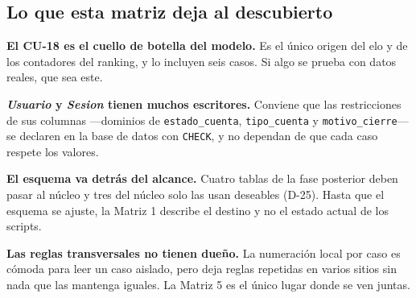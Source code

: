 \subsection*{Lo que esta matriz deja al descubierto}
\begin{flujo}
  \item \textbf{El \mbox{CU-18} es el cuello de botella del modelo.} Es el único origen del elo y de los contadores del ranking, y lo incluyen seis casos. Si algo se prueba con datos reales, que sea este.
  \item \textbf{\textit{Usuario} y \textit{Sesion} tienen muchos escritores.} Conviene que las restricciones de sus columnas —dominios de \texttt{estado\_\allowbreak{}cuenta}, \texttt{tipo\_\allowbreak{}cuenta} y \texttt{motivo\_\allowbreak{}cierre}— se declaren en la base de datos con \texttt{CHECK}, y no dependan de que cada caso respete los valores.
  \item \textbf{El esquema va detrás del alcance.} Cuatro tablas de la fase posterior deben pasar al núcleo y tres del núcleo solo las usan deseables (\mbox{D-25}). Hasta que el esquema se ajuste, la Matriz 1 describe el destino y no el estado actual de los scripts.
  \item \textbf{Las reglas transversales no tienen dueño.} La numeración local por caso es cómoda para leer un caso aislado, pero deja reglas repetidas en varios sitios sin nada que las mantenga iguales. La Matriz 5 es el único lugar donde se ven juntas.
\end{flujo}
